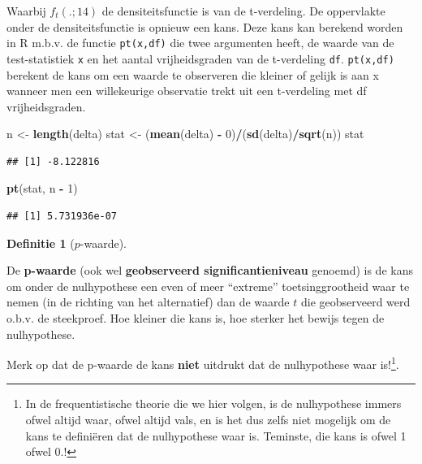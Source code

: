 \documentclass[
  12pt,dutch]{book}
\newenvironment{Shaded}{\begin{snugshade}}{\end{snugshade}}
\newcommand{\DecValTok}[1]{\textcolor[rgb]{0.00,0.00,0.81}{#1}}
\newcommand{\FunctionTok}[1]{\textcolor[rgb]{0.13,0.29,0.53}{\textbf{#1}}}
\newcommand{\NormalTok}[1]{#1}
\newcommand{\OtherTok}[1]{\textcolor[rgb]{0.56,0.35,0.01}{#1}}
\newcommand{\SpecialCharTok}[1]{\textcolor[rgb]{0.81,0.36,0.00}{\textbf{#1}}}
\theoremstyle{definition}
\newtheorem{definition}{Definitie}[chapter]
\theoremstyle{definition}
\theoremstyle{definition}
\theoremstyle{definition}
\theoremstyle{remark}
\begin{document}
Waarbij \(f_t(.;14)\) de densiteitsfunctie is van de t-verdeling.
De oppervlakte onder de densiteitsfunctie is opnieuw een kans.
Deze kans kan berekend worden in R m.b.v. de functie \texttt{pt(x,df)} die twee argumenten heeft, de waarde van de test-statistiek \texttt{x} en het aantal vrijheidsgraden van de t-verdeling \texttt{df}.
\texttt{pt(x,df)} berekent de kans om een waarde te observeren die kleiner of gelijk is aan x wanneer men een willekeurige observatie trekt uit een t-verdeling met df vrijheidsgraden.

\begin{Shaded}
\begin{Highlighting}[]
\NormalTok{n }\OtherTok{\textless{}{-}} \FunctionTok{length}\NormalTok{(delta)}
\NormalTok{stat }\OtherTok{\textless{}{-}}\NormalTok{ (}\FunctionTok{mean}\NormalTok{(delta) }\SpecialCharTok{{-}} \DecValTok{0}\NormalTok{)}\SpecialCharTok{/}\NormalTok{(}\FunctionTok{sd}\NormalTok{(delta)}\SpecialCharTok{/}\FunctionTok{sqrt}\NormalTok{(n))}
\NormalTok{stat}
\end{Highlighting}
\end{Shaded}

\begin{verbatim}
## [1] -8.122816
\end{verbatim}

\begin{Shaded}
\begin{Highlighting}[]
\FunctionTok{pt}\NormalTok{(stat, n }\SpecialCharTok{{-}} \DecValTok{1}\NormalTok{)}
\end{Highlighting}
\end{Shaded}

\begin{verbatim}
## [1] 5.731936e-07
\end{verbatim}

\begin{definition}[$p$-waarde]
\protect\hypertarget{def:unnamed-chunk-163}{}\label{def:unnamed-chunk-163}~
\end{definition}

De \textbf{p-waarde} (ook wel \textbf{geobserveerd significantieniveau} genoemd) is de
kans om onder de nulhypothese een even of meer ``extreme'' toetsinggrootheid
waar te nemen (in de richting van het alternatief) dan de waarde \(t\) die
geobserveerd werd o.b.v. de steekproef. Hoe kleiner die kans is, hoe sterker het bewijs tegen de
nulhypothese.

Merk op dat de p-waarde de kans \textbf{niet} uitdrukt dat de nulhypothese waar is!\footnote{In de frequentistische theorie die we hier volgen, is de nulhypothese immers ofwel altijd waar, ofwel altijd vals, en is het dus zelfs niet mogelijk om de kans te definiëren dat de nulhypothese waar is. Teminste, die kans is ofwel 1 ofwel 0.!}.
\end{document}
